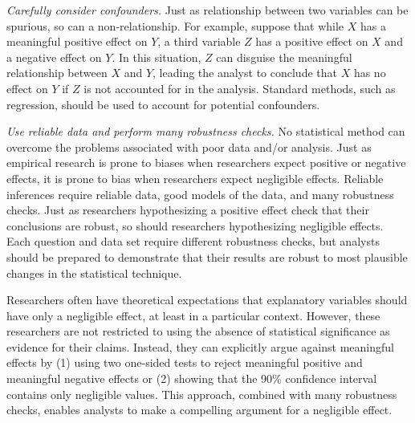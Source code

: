 \documentclass[12pt]{article}
\begin{document}
\textit{Carefully consider confounders.} Just as relationship between two variables can be spurious, so can a non-relationship. For example, suppose that while $X$ has a meaningful positive effect on $Y$, a third variable $Z$ has a positive effect on $X$ and a negative effect on $Y$. In this situation, $Z$ can disguise the meaningful relationship between $X$ and $Y$, leading the analyst to conclude that $X$ has no effect on $Y$ if $Z$ is not accounted for in the analysis. Standard methods, such as regression, should be used to account for potential confounders.

\textit{Use reliable data and perform many robustness checks.} No statistical method can overcome the problems associated with poor data and/or analysis. Just as empirical research is prone to biases when researchers expect positive or negative effects, it is prone to bias when researchers expect negligible effects. Reliable inferences require reliable data, good models of the data, and many robustness checks. Just as researchers hypothesizing a positive effect check that their conclusions are robust, so should researchers hypothesizing negligible effects. Each question and data set require different robustness checks, but analysts should be prepared to demonstrate that their results are robust to most plausible changes in the statistical technique.

Researchers often have theoretical expectations that explanatory variables should have only a negligible effect, at least in a particular context. However, these researchers are not restricted to using the absence of statistical significance as evidence for their claims. Instead, they can explicitly argue against meaningful effects by (1) using two one-sided tests to reject meaningful positive and meaningful negative effects or (2)
showing that the 90\% confidence interval contains only negligible values. This approach, combined with many robustness checks, enables analysts to make a compelling argument for a negligible effect.


\clearpage
\singlespace \normalsize


\end{document}
